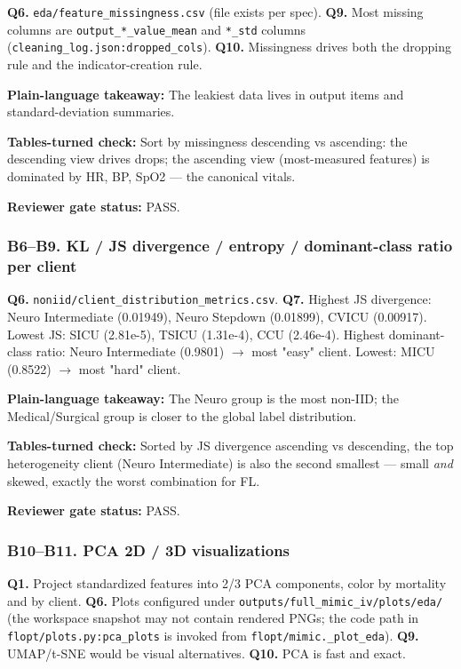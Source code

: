 \documentclass{article}
\begin{document}
\textbf{Q6.} \texttt{eda/feature\_missingness.csv} (file exists per spec). \textbf{Q9.} Most missing columns are \texttt{output\_*\_value\_mean} and \texttt{*\_std} columns (\texttt{cleaning\_log.json:dropped\_cols}). \textbf{Q10.} Missingness drives both the dropping rule and the indicator-creation rule.


\textbf{Plain-language takeaway:} The leakiest data lives in output items and standard-deviation summaries.


\textbf{Tables-turned check:} Sort by missingness descending vs ascending: the descending view drives drops; the ascending view (most-measured features) is dominated by HR, BP, SpO2 --- the canonical vitals.


\textbf{Reviewer gate status:} PASS.


\subsubsection{B6--B9. KL / JS divergence / entropy / dominant-class ratio per client}


\textbf{Q6.} \texttt{noniid/client\_distribution\_metrics.csv}. \textbf{Q7.} Highest JS divergence: Neuro Intermediate (0.01949), Neuro Stepdown (0.01899), CVICU (0.00917). Lowest JS: SICU (2.81e-5), TSICU (1.31e-4), CCU (2.46e-4). Highest dominant-class ratio: Neuro Intermediate (0.9801) \ensuremath{\rightarrow} most "easy" client. Lowest: MICU (0.8522) \ensuremath{\rightarrow} most "hard" client.


\textbf{Plain-language takeaway:} The Neuro group is the most non-IID; the Medical/Surgical group is closer to the global label distribution.


\textbf{Tables-turned check:} Sorted by JS divergence ascending vs descending, the top heterogeneity client (Neuro Intermediate) is also the second smallest --- small \emph{and} skewed, exactly the worst combination for FL.


\textbf{Reviewer gate status:} PASS.


\subsubsection{B10--B11. PCA 2D / 3D visualizations}


\textbf{Q1.} Project standardized features into 2/3 PCA components, color by mortality and by client. \textbf{Q6.} Plots configured under \texttt{outputs/full\_mimic\_iv/plots/eda/} (the workspace snapshot may not contain rendered PNGs; the code path in \texttt{flopt/plots.py:pca\_plots} is invoked from \texttt{flopt/mimic.\_plot\_eda}). \textbf{Q9.} UMAP/t-SNE would be visual alternatives. \textbf{Q10.} PCA is fast and exact.
\end{document}
